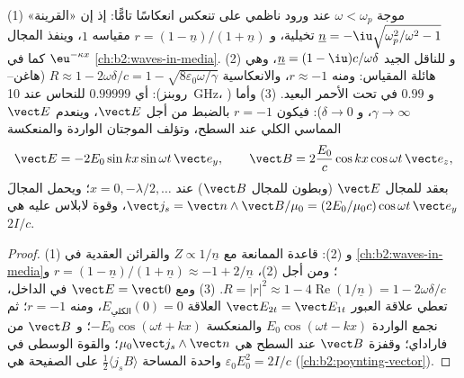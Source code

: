 \begin{proposition}\label{prop:b2:wave-interfaces:conductors}
(1) موجة $\omega < \omega_p$ عند ورود ناظمي على  تنعكس انعكاسًا
تامًّا: إذ إن «القرينة» $\underline n = -\iu\sqrt{\omega_p^2/\omega^2 - 1}$ تخيلية،
و $r = (1 - \underline n)/(1 + \underline n)$ مقياسه $1$، وينفذ المجال
 $\eu^{-\kappa x}$ كما في \cref{ch:b2:waves-in-media}. (2) و
للناقل الجيد $\underline n = (1 - \iu)c/\omega\delta$، وهي هائلة المقياس: ومنه $r \approx
-1$، والانعكاسية $R \approx 1 - 2\omega\delta/c = 1 - \sqrt{8\varepsilon_0\omega/\gamma}$
(هاغن--روبنز): أي $0.99999$ للنحاس عند \qty{10}{GHz}، و $0.99$ في تحت الأحمر
البعيد. (3) وأما \emph{} ($\gamma \to \infty$، و $\delta \to 0$):
فيكون $r = -1$ بالضبط من أجل $\vect E$، وينعدم $\vect E$ المماسي الكلي عند
السطح، وتؤلف الموجتان الواردة والمنعكسة 
\[
\vect E = -2E_0\sin kx\sin\omega t\,\vect e_y , \qquad
\vect B = 2\frac{E_0}c\cos kx\cos\omega t\,\vect e_z ,
\]
بعقد للمجال $\vect E$ (وبطون للمجال $\vect B$) عند $x = 0, -\lambda/2, \dots$؛ ويحمل
المجالَ \emph{} $\vect j_s = \vect n\wedge\vect B/
\mu_0 = (2E_0/\mu_0c)\cos\omega t\,\vect e_y$، وقوة لابلاس عليه هي
 $2I/c$.
\end{proposition}

\begin{proof}
(1) و (2): قاعدة الممانعة مع $Z \propto 1/\underline n$ والقرائن
العقدية في \cref{ch:b2:waves-in-media}؛ ومن أجل (2)، $r = (1 - \underline n)/(1 +
\underline n) \approx -1 + 2/\underline n$ و $R = |r|^2 \approx 1 - 4\operatorname{Re}(1/
\underline n) = 1 - 2\omega\delta/c$. (3) ومع $\vect E = \vect 0$ في الداخل، تعطي
علاقة العبور $\vect E_{2t} = \vect E_{1t}$ العلاقة $E_{\text{الكلي}}(0) = 0$، ومنه $r =
-1$؛ ثم نجمع الواردة $E_0\cos(\omega t - kx)$ والمنعكسة $-E_0\cos(\omega t + kx)$؛
و $\vect B$ من فاراداي؛ وقفزة $\vect B$ عند السطح هي $\mu_0\vect j_s
\wedge\vect n$؛ والقوة الوسطى في واحدة المساحة $\tfrac12\langle j_sB\rangle$ على
الصفيحة هي $\varepsilon_0E_0^2 = 2I/c$ (\cref{ch:b2:poynting-vector}).
\end{proof}

